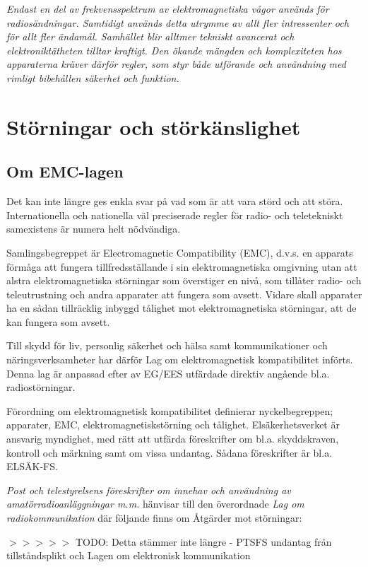 \emph{Endast en del av frekvensspektrum av elektromagnetiska vågor
  används för radiosändningar. Samtidigt används detta utrymme av allt
  fler intressenter och för allt fler ändamål.  Samhället blir alltmer
  tekniskt avancerat och elektroniktätheten tilltar kraftigt. Den
  ökande mängden och komplexiteten hos apparaterna kräver därför
  regler, som styr både utförande och användning med rimligt
  bibehållen säkerhet och funktion.}

\section{Störningar och störkänslighet}

\subsection{Om EMC-lagen}
\label{EMC-lagen}

Det kan inte längre ges enkla svar på vad som är att vara störd och
att störa. Internationella och nationella väl preciserade regler för
radio- och teletekniskt samexistens är numera helt nödvändiga.

Samlingsbegreppet är Electromagnetic Compatibility (EMC), d.v.s. en
apparats förmåga att fungera tillfredsställande i sin
elektromagnetiska omgivning utan att alstra elektromagnetiska
störningar som överstiger en nivå, som tillåter radio- och
teleutrustning och andra apparater att fungera som avsett.  Vidare
skall apparater ha en sådan tillräcklig inbyggd tålighet mot
elektromagnetiska störningar, att de kan fungera som avsett.

Till skydd för liv, personlig säkerhet och hälsa samt kommunikationer
och näringsverksamheter har därför Lag om elektromagnetisk
kompatibilitet införts. Denna lag är anpassad efter av EG/EES
utfärdade direktiv angående bl.a. radiostörningar.

Förordning om elektromagnetisk kompatibilitet definierar
nyckelbegreppen; apparater, EMC, elektromagnetiskstörning och
tålighet. Elsäkerhetsverket är ansvarig myndighet, med rätt att
utfärda föreskrifter om bl.a. skyddskraven, kontroll och märkning samt
om vissa undantag. Sådana föreskrifter är bl.a. ELSÄK-FS.

\emph{Post och telestyrelsens föreskrifter om innehav och användning
  av amatörradioanläggningar m.m.} hänvisar till den överordnade
\emph{Lag om radiokommunikation} där följande finns om Åtgärder mot
störningar:

$>>>>>$ TODO: Detta stämmer inte längre - PTSFS undantag från tillståndsplikt
och Lagen om elektronisk kommunikation

